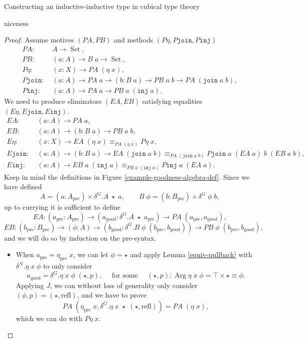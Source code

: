 \documentclass[acmsmall,review]{acmart}\settopmatter{printfolios=true,printccs=false,printacmref=false}
\DeclareMathOperator{\USet}{Set}
\DeclareMathOperator{\Arg}{Arg}
\newcommand{\pre}[1]{{#1}_\text{pre}}
\newcommand{\good}[1]{{#1}_\text{good}}
\newcommand{\Id}[2]{{#1}\equiv{#2}}
\newcommand{\IdA}[3]{{#1}\equiv_{#3}{#2}}
\newcommand{\join}{\texttt{join}}
\newcommand{\inj}{\texttt{inj}}
\begin{document}
\begin{section}{Constructing an inductive-inductive type in cubical type theory}
\begin{subsection}{niceness}
\begin{proof}
Assume motives $(PA, PB)$ and methods $(P\eta, P\join, P\inj)$
\begin{align*}
PA :&\; A \to \USet,\\
PB :&\; (a : A) \to B\;a\to \USet,\\
P\eta :&\; (x : X) \to PA\;(\eta\;x),\\
P\join :&\; (a : A) \to PA\;a\to (b : B\;a) \to PB\;a\;b \to PA\;(\join\;a\;b),\\
P\inj :&\; (a : A) \to PA\;a\to PB\;a\;(\inj\;a).
\end{align*}
We need to produce eliminators $(EA, EB)$ satisfying equalities $(E\eta, E\join, E\inj)$.
\begin{align*}
EA :&\; (a : A) \to PA\;a,\\
EB :&\; (a : A) \to (b : B\;a) \to PB\;a\;b,\\
E\eta :&\; (x : X) \to \IdA{EA\;(\eta\;x)}{P\eta\;x}{PA\;(\eta\;x)},\\
E\join :&\; (a : A) \to (b : B\;a) \to \IdA{EA\;(\join\;a\;b)}{P\join\;a\;(EA\;a)\;b\;(EB\;a\;b)}{PA\;(\join\;a\;b)},\\
E\inj :&\; (a : A) \to \IdA{EB\;a\;(\inj\;a)}{P\inj\;a\;(EA\;a)}{PB\;a\;(\inj\;a)}.
\end{align*}
Keep in mind the definitions in Figure \ref{example-goodness-algebra-def}.
Since we have defined \[A = (a : \pre{A}) \times \delta^G.A\;\star\;a,\qquad B\;\phi = (b : \pre{B})\times\delta^G\;\phi\;b,\] up to currying it is sufficient to define \[EA : (\pre{a} : \pre{A}) \to (\good{a} : \delta^G.A\;\star\;\pre{a}) \to PA\;(\pre{a}, \good{a}),\]\[EB : (\pre{b} : \pre{B}) \to (\phi : A) \to (\good{b} : \delta^G.B\;\phi\;(\pre{b}, \good{b})) \to PB\;\phi\;(\pre{b}, \good{b}),\] and we will do so by induction on the pre-syntax.
\begin{itemize}
\item When $\pre{a} = \pre{\eta}\;x$, we can let $\phi = \star$ and apply Lemma \ref{equiv-pullback} with $\delta^N.\eta\;x\;\phi$ to only consider \[\good{a} = \delta^G.\eta\;x\;\phi\;(\star, p),\quad\text{ for some }\quad(\star, p) : \Arg\eta\;x\;\phi = \top \times \Id{\star}{\phi}.\] Applying $J$, we can without loss of generality only consider $(\phi, p) = (\star, \text{refl})$, and we have to prove \[PA\;(\pre{\eta}\;x, \delta^G.\eta\;x\;\star\;(\star, \text{refl})) = PA\;(\eta\;x),\] which we can do with $P\eta\;x$.

\end{itemize}
\end{proof}
\end{subsection}
\end{section}
\end{document}
